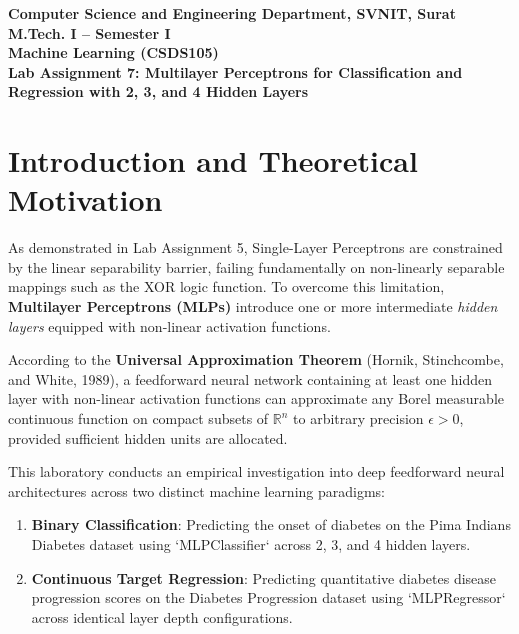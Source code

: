 \documentclass[12pt]{article}
\begin{document}

\begin{center}
\textbf{Computer Science and Engineering Department, SVNIT, Surat}\\
\textbf{M.Tech. I -- Semester I}\\
\textbf{Machine Learning (CSDS105)}\\
\textbf{Lab Assignment 7: Multilayer Perceptrons for Classification and Regression with 2, 3, and 4 Hidden Layers}
\end{center}

\vspace{0.3cm}

\section{Introduction and Theoretical Motivation}

As demonstrated in Lab Assignment 5, Single-Layer Perceptrons are constrained by the linear separability barrier, failing fundamentally on non-linearly separable mappings such as the XOR logic function. To overcome this limitation, \textbf{Multilayer Perceptrons (MLPs)} introduce one or more intermediate \textit{hidden layers} equipped with non-linear activation functions. 

According to the \textbf{Universal Approximation Theorem} (Hornik, Stinchcombe, and White, 1989), a feedforward neural network containing at least one hidden layer with non-linear activation functions can approximate any Borel measurable continuous function on compact subsets of $\mathbb{R}^n$ to arbitrary precision $\epsilon > 0$, provided sufficient hidden units are allocated.

This laboratory conducts an empirical investigation into deep feedforward neural architectures across two distinct machine learning paradigms:
\begin{enumerate}
    \item \textbf{Binary Classification}: Predicting the onset of diabetes on the Pima Indians Diabetes dataset using `MLPClassifier` across 2, 3, and 4 hidden layers.
    \item \textbf{Continuous Target Regression}: Predicting quantitative diabetes disease progression scores on the Diabetes Progression dataset using `MLPRegressor` across identical layer depth configurations.
\end{enumerate}
\end{document}
